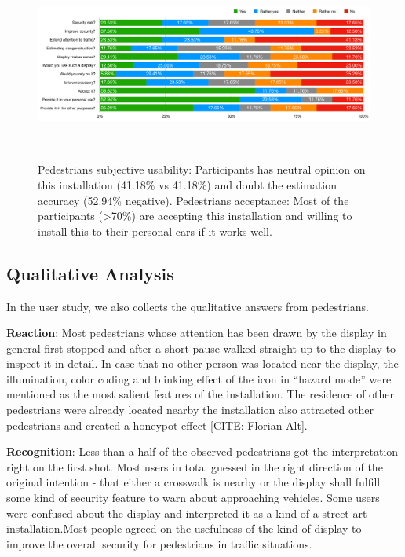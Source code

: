 \begin{figure}
\centering
\includegraphics[width=1.75\columnwidth]{figures/likert}
\caption{
    Pedestrians subjective usability: Participants has neutral opinion on this installation (41.18\% vs 41.18\%) 
    and doubt the estimation accuracy (52.94\% negative).
    Pedestrians acceptance: Most of the participants (>70\%) are accepting this installation 
    and willing to install this to their personal cars if it works well.
}~\label{fig:figure2}
\end{figure}

\subsection{Qualitative Analysis}

In the user study, we also collects the qualitative answers from pedestrians. 

\textbf{Reaction}: Most pedestrians whose attention has been drawn by the display in general first stopped and after a short pause walked straight up to the display to inspect it in detail. In case that no other person was located near the display, the illumination, color coding and blinking effect of the icon in “hazard mode” were mentioned as the most salient features of the installation. The residence of other pedestrians were already located nearby the installation also attracted other pedestrians and created a honeypot effect [CITE: Florian Alt]. 

\textbf{Recognition}: Less than a half of the observed pedestrians got the interpretation right on the first shot. Most users in total guessed in the right direction of the original intention - that either a crosswalk is nearby or the display shall fulfill some kind of security feature to warn about approaching vehicles. Some users were confused about the display and interpreted it as a kind of a street art installation.Most people agreed on the usefulness of the kind of display to improve the overall security for pedestrians in traffic situations. 

